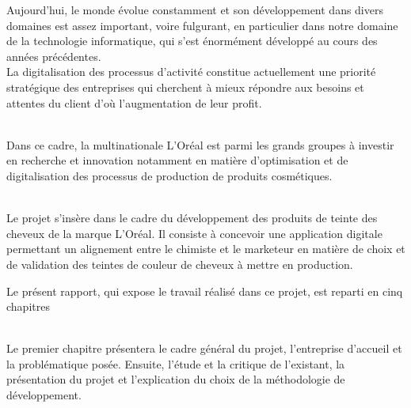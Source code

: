 \pagestyle{fancy}
\fancyhead[L]{\ungaramond\small\textbf{}}
\fancyhead[C]{}
\fancyhead[R]{\ungaramond\small\textbf{}}
\fancyfoot[C]{}
\renewcommand{\headrulewidth}{1.7pt}
\renewcommand{\headrule}{\hbox to\headwidth{\color{gray}\leaders\hrule height \headrulewidth\hfill}}
\renewcommand{\footrulewidth}{1.7pt}
\renewcommand{\footrule}{\hbox to\headwidth{\color{gray}\leaders\hrule height \footrulewidth\hfill}}
\begin{center}

\end{center}
\vspace{0.8cm}

\noindent Aujourd'hui, le monde évolue constamment et son développement dans divers domaines est assez important, voire fulgurant, en particulier dans notre domaine de la technologie informatique, qui s'est énormément développé au cours des années précédentes.
\\
La digitalisation des processus d'activité constitue actuellement une priorité stratégique des entreprises qui cherchent à mieux répondre aux besoins et attentes du client d’où l’augmentation de leur profit.

\\Dans ce cadre, la multinationale L'Oréal est parmi les grands groupes à investir en recherche et innovation notamment en matière d'optimisation et de digitalisation des processus de production de produits cosmétiques.

\\Le projet s’insère dans le cadre du développement des produits de teinte des cheveux de la marque L’Oréal. Il consiste à concevoir une application digitale permettant un alignement entre le chimiste et le marketeur en matière de choix et de validation des teintes de couleur de cheveux à mettre en production.

Le présent rapport, qui expose le travail réalisé dans ce projet, est reparti en cinq chapitres

\\Le premier chapitre présentera le cadre général du projet, l’entreprise d’accueil et la problématique posée. Ensuite, l’étude et la critique de l’existant, la présentation du projet et l’explication du choix de la méthodologie de développement.

